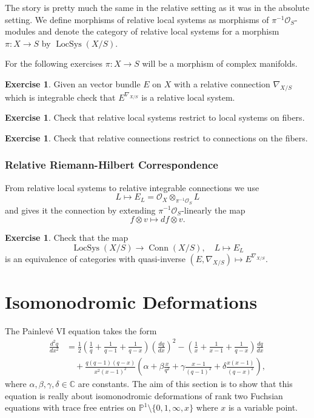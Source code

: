 \documentclass[12pt]{book}
\numberwithin{equation}{section}
\theoremstyle{definition}
\newtheorem{exercise}[theorem]{Exercise}
\theoremstyle{remark}
\newcommand{\CC}{\mathbb{C}}
\newcommand{\PP}{\mathbb{P}}
\newcommand{\Ocal}{\mathcal{O}}
\newcommand{\LocSys}{\operatorname{LocSys}}
\newcommand{\Conn}{\operatorname{Conn}}
\newcommand{\deligne}[1]{\cite[ #1 ,\href{https://labs.thosgood.com/translations/978-3-540-05190-9.pdf}{Hosgood translation}]{Deligne1970}}
\begin{document}
The story is pretty much the same in the relative setting as it was in the absolute setting. 
We define morphisms of relative local systems as morphisms of $\pi^{-1}\Ocal_S$-modules and denote the category of relative local systems for a morphism $\pi:X \to S$ by $\LocSys(X/S)$.


For the following exercises $\pi:X\to S$ will be a morphism of complex manifolds. 
\begin{exercise}
	Given an vector bundle $E$ on $X$ with a relative connection $\nabla_{X/S}$ which is integrable check that $E^{\nabla_{X/S}}$ is a relative local system. 
\end{exercise}

\begin{exercise}
	Check that relative local systems restrict to local systems on fibers.
\end{exercise}

\begin{exercise}
	Check that relative connections restrict to connections on the fibers. 
\end{exercise}



\subsection{Relative Riemann-Hilbert Correspondence}
From relative local systems to relative integrable connections we use 
 $$ L \mapsto E_L = \Ocal_X\otimes_{\pi^{-1} \Ocal_S} L $$
and gives it the connection by extending $\pi^{-1}\Ocal_S$-linearly the map 
 $$ f \otimes v \mapsto df \otimes v.$$

\begin{exercise}
	Check that the map 
	$$\LocSys(X/S) \to \Conn(X/S), \quad L \mapsto E_L $$
	is an equivalence of categories with quasi-inverse $(E,\nabla_{X/S}) \mapsto E^{\nabla_{X/S}}$. 
	\deligne{Chapter I, Prop 2.23}
\end{exercise}


\chapter{Isomonodromic Deformations}

The Painlev\'e VI equation takes the form
 \begin{align*}\frac{d^2q}{dx^2}&=
 \frac{1}{2}\left(\frac{1}{q}+\frac{1}{q-1}+\frac{1}{q-x}\right)\left( \frac{dq}{dx} \right)^2
 -\left(\frac{1}{x}+\frac{1}{x-1}+\frac{1}{q-x}\right)\frac{dq}{dx} \\&\quad +
 \frac{q(q-1)(q-x)}{x^2(x-1)^2}
 \left(\alpha+\beta\frac{x}{q^2}+\gamma\frac{x-1}{(q-1)^2}+\delta\frac{x(x-1)}{(q-x)^2}\right),
 \end{align*}
where $\alpha,\beta,\gamma,\delta \in \CC$ are constants.
The aim of this section is to show that this equation is really about isomonodromic deformations of rank two Fuchsian equations with trace free entries on $\PP^1\setminus \lbrace 0,1,\infty, x\rbrace$ where $x$ is a variable point.
\end{document}
